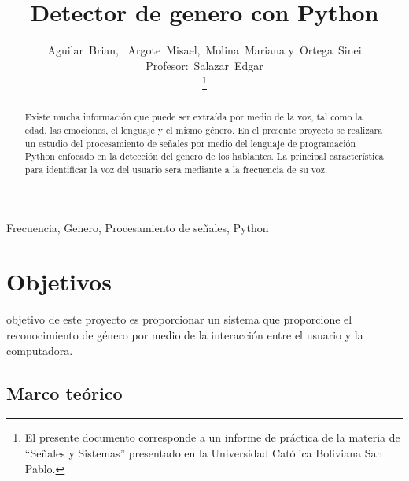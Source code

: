 \documentclass[journal]{IEEEtran}
\begin{document}
\title{Detector de genero con Python}
\author{Aguilar~Brian,~
        Argote~Misael,~Molina~Mariana
        y~Ortega~Sinei\\
				Profesor:~Salazar~Edgar\\%
\thanks{El presente documento corresponde a un informe de práctica de la materia de ``Señales y Sistemas'' presentado en la Universidad Católica Boliviana San Pablo.}} %

\maketitle
\begin{abstract}
Existe mucha información que puede ser extraída por medio de la voz, tal como la edad, las emociones, el lenguaje y el mismo género. En el presente proyecto se realizara un estudio del procesamiento de señales por medio del lenguaje de programación Python enfocado en la detección del genero de los hablantes. La principal característica para identificar la voz del usuario sera mediante a la frecuencia de su voz.

\end{abstract}
\begin{IEEEkeywords}
Frecuencia, Genero, Procesamiento de señales, Python 

\end{IEEEkeywords}
\section{Objetivos}
 objetivo de este proyecto es proporcionar un sistema que proporcione el reconocimiento de género por medio de la interacción entre el usuario y la computadora.

\subsection{Marco teórico}
\end{document}
